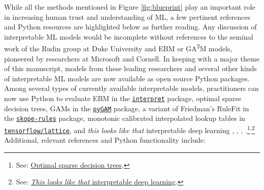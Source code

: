 \documentclass[information,article,submit,moreauthors,pdftex]{definitions/mdpi}
\begin{document}
While all the methods mentioned in Figure \ref{fig:blueprint} play an important role in increasing human trust and understanding of ML, a few pertinent references and Python resources are highlighted below as further reading. Any discussion of interpretable ML models would be incomplete without references to the seminal work of the Rudin group at Duke University and EBM or GA\textsuperscript{2}M models, pioneered by researchers at Microsoft and Cornell. In keeping with a major theme of this manuscript, models from these leading researchers and several other kinds of interpretable ML models are now available as open source Python packages. Among several types of currently available interpretable models, practitioners can now use Python to evaluate EBM in the \href{https://github.com/interpretml/interpret}{\texttt{interpret}} package, optimal sparse decision trees, GAMs in the \href{https://github.com/dswah/pyGAM}{\texttt{pyGAM}} package, a variant of Friedman's RuleFit  in the \href{https://github.com/scikit-learn-contrib/skope-rules}{\texttt{skope-rules}} package, monotonic calibrated interpolated lookup tables in \href{https://github.com/tensorflow/lattice}{\texttt{tensorflow/lattice}}, and \textit{this looks like that} interpretable deep learning \cite{osdt}, \cite{rulefit}, \cite{lattice}, \cite{this_looks_like_that}.\footnote{See: \href{https://github.com/xiyanghu/OSDT}{Optimal sparse decision trees}.}\textsuperscript{,}\footnote{See: \href{https://github.com/cfchen-duke/ProtoPNet}{\textit{This looks like that} interpretable deep learning}.} Additional, relevant references and Python functionality include:
\end{document}
